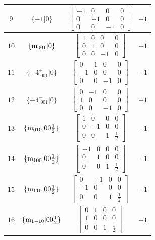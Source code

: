 \documentclass[fleqn,8pt]{jsarticle}
\begin{document}
\begin{longtable}{cccc}
$ 9 $ & $ \{-1|0\} $ & $ \begin{bmatrix} -1 & 0 & 0 & 0 \\ 0 & -1 & 0 & 0 \\ 0 & 0 & -1 & 0 \end{bmatrix} $ & $ -1 $ \\ \hline
$ 10 $ & $ \{{\rm m}_{001}|0\} $ & $ \begin{bmatrix} 1 & 0 & 0 & 0 \\ 0 & 1 & 0 & 0 \\ 0 & 0 & -1 & 0 \end{bmatrix} $ & $ -1 $ \\ \hline
$ 11 $ & $ \{-4^{+}_{\,\,001}|0\} $ & $ \begin{bmatrix} 0 & 1 & 0 & 0 \\ -1 & 0 & 0 & 0 \\ 0 & 0 & -1 & 0 \end{bmatrix} $ & $ -1 $ \\ \hline
$ 12 $ & $ \{-4^{-}_{\,\,001}|0\} $ & $ \begin{bmatrix} 0 & -1 & 0 & 0 \\ 1 & 0 & 0 & 0 \\ 0 & 0 & -1 & 0 \end{bmatrix} $ & $ -1 $ \\ \hline
$ 13 $ & $ \{{\rm m}_{010}|0 0 \frac{1}{2}\} $ & $ \begin{bmatrix} 1 & 0 & 0 & 0 \\ 0 & -1 & 0 & 0 \\ 0 & 0 & 1 & \frac{1}{2} \end{bmatrix} $ & $ -1 $ \\ \hline
$ 14 $ & $ \{{\rm m}_{100}|0 0 \frac{1}{2}\} $ & $ \begin{bmatrix} -1 & 0 & 0 & 0 \\ 0 & 1 & 0 & 0 \\ 0 & 0 & 1 & \frac{1}{2} \end{bmatrix} $ & $ -1 $ \\ \hline
$ 15 $ & $ \{{\rm m}_{110}|0 0 \frac{1}{2}\} $ & $ \begin{bmatrix} 0 & -1 & 0 & 0 \\ -1 & 0 & 0 & 0 \\ 0 & 0 & 1 & \frac{1}{2} \end{bmatrix} $ & $ -1 $ \\ \hline
$ 16 $ & $ \{{\rm m}_{1-10}|0 0 \frac{1}{2}\} $ & $ \begin{bmatrix} 0 & 1 & 0 & 0 \\ 1 & 0 & 0 & 0 \\ 0 & 0 & 1 & \frac{1}{2} \end{bmatrix} $ & $ -1 $ \\
\end{longtable}
\end{document}
